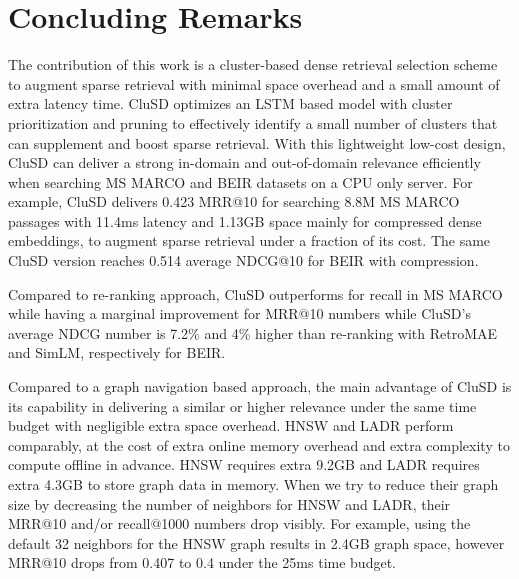\section{Concluding Remarks}

The contribution of this work is a cluster-based dense retrieval selection scheme  
to augment sparse retrieval with minimal space overhead and a small amount of extra latency  time.
CluSD optimizes an LSTM based model with cluster prioritization and pruning
to effectively identify  a small number of clusters that can supplement and boost  sparse retrieval. 
With this lightweight low-cost design,  
CluSD can deliver a strong in-domain and out-of-domain relevance  efficiently when searching  MS MARCO and BEIR datasets
on a CPU only server. %
For example, CluSD delivers 0.423 MRR@10  for searching 8.8M MS MARCO passages 
with 11.4ms  latency and  1.13GB space mainly for compressed dense embeddings, to augment sparse retrieval under
a fraction of its  cost. The same  CluSD version  reaches  0.514 average NDCG@10 for BEIR with compression.

Compared to re-ranking approach, CluSD outperforms for recall in MS MARCO while having a marginal improvement for MRR@10 numbers 
while  CluSD’s average NDCG number is 7.2\% and 4\% higher than re-ranking with RetroMAE and SimLM, respectively for BEIR.


Compared to a  graph navigation based approach, the main advantage of CluSD is its capability in delivering 
a similar or higher relevance under the same time budget with negligible extra space overhead. 
HNSW and LADR perform comparably, at the cost of extra online memory overhead  and extra complexity to compute offline in advance.
HNSW requires extra 9.2GB and LADR requires extra 4.3GB to store graph data in memory.
When we  try to reduce their graph size by decreasing  the number of neighbors for HNSW and LADR, their  MRR@10 and/or  recall@1000 numbers drop visibly. For example,
using the default 32 neighbors for the HNSW graph results in 2.4GB graph space, however  MRR@10 drops from 0.407 to 0.4 under the 25ms time budget.



